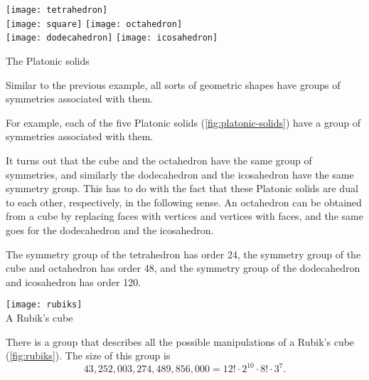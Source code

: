 \begin{marginfigure}
    \centering
    \texttt{[image: tetrahedron]} \\
    \texttt{[image: square]}
    \texttt{[image: octahedron]} \\
    \texttt{[image: dodecahedron]}
    \texttt{[image: icosahedron]}
    \caption{The Platonic solids}
    \label{fig:platonic-solids}
\end{marginfigure}


\begin{example}
    Similar to the previous example, all sorts of geometric shapes have groups of symmetries associated with them.

    For example, each of the five Platonic solids (\cref{fig:platonic-solids}) have a group of symmetries associated with them.

    It turns out that the cube and the octahedron have the same group of symmetries, and similarly the dodecahedron and the icosahedron have the same symmetry group.
    This has to do with the fact that these Platonic solids are dual to each other, respectively, in the following sense.
    An octahedron can be obtained from a cube by replacing faces with vertices and vertices with faces, and the same goes for the dodecahedron and the icosahedron.

    The symmetry group of the tetrahedron has order 24, the symmetry group of the cube and octahedron has order 48, and the symmetry group of the dodecahedron and icosahedron has order 120.
\end{example}

\begin{marginfigure}
    \centering
    \texttt{[image: rubiks]} \\
    \caption{A Rubik's cube}
    \label{fig:rubiks}
\end{marginfigure}

\begin{example}
    There is a group that describes all the possible manipulations of a Rubik's cube (\cref{fig:rubiks}).
    The size of this group is
    \begin{equation}
        43,252,003,274,489,856,000 = 12! \cdot 2^{10} \cdot 8! \cdot 3^7.
    \end{equation}
\end{example}

